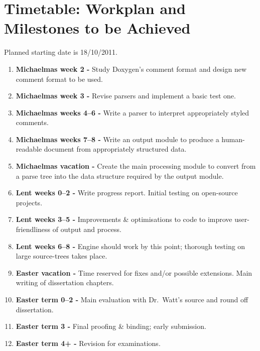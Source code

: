 \section{Timetable: Workplan and Milestones to be Achieved}

Planned starting date is 18/10/2011.

\begin{enumerate}

\item {\bf Michaelmas week 2 -} Study Doxygen's comment format and
  design new comment format to be used.

\item {\bf Michaelmas week 3 -} Revise parsers and implement a basic
  test one.

\item {\bf Michaelmas weeks 4--6 -} Write a parser to interpret
  appropriately styled comments.

\item {\bf Michaelmas weeks 7--8 -} Write an output module to produce a
  human-readable document from appropriately structured data.

\item {\bf Michaelmas vacation -} Create the main processing module to
  convert from a parse tree into the data structure required by the
  output module.

\item {\bf Lent weeks 0--2 -} Write progress report. Initial testing on
  open-source projects.

\item {\bf Lent weeks 3--5 -} Improvements \& optimisations to code to
  improve user-friendliness of output and process.

\item {\bf Lent weeks 6--8 -} Engine should work by this point; thorough
  testing on large source-trees takes place.

\item {\bf Easter vacation -} Time reserved for fixes and/or possible
  extensions. Main writing of dissertation chapters.

\item {\bf Easter term 0--2 -} Main evaluation with Dr.~Watt's source and round off dissertation.

\item {\bf Easter term 3 -} Final proofing \& binding; early submission.

\item {\bf Easter term 4+ -} Revision for examinations.

\end{enumerate}


 

